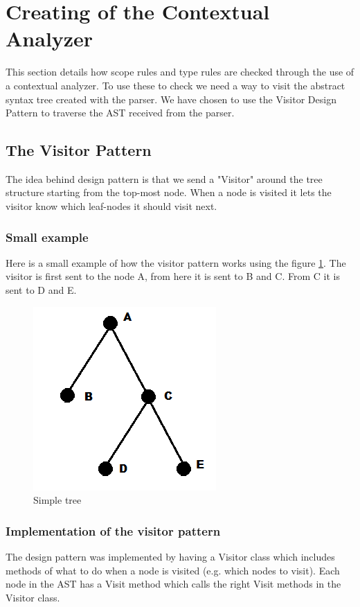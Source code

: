 \section{Creating of the Contextual Analyzer}
	This section details how scope rules and type rules are checked through the use of a contextual analyzer.
	To use these to check we need a way to visit the abstract syntax tree created with the parser. We have chosen to use 
	the Visitor Design Pattern to traverse the AST received from the parser.
	
	\subsection{The Visitor Pattern}
		The idea behind design pattern is that we send a "Visitor" around the tree structure starting from the top-most node. When a node is 
		visited it lets the visitor know which leaf-nodes it should visit next. \\
		
		\subsubsection*{Small example}
			Here is a small example of how the visitor pattern works using the figure \ref{fig:simpletree}. 
			The visitor is first sent to the node A, from here it is sent to B and C. From C it is sent to D and E.
		
			\begin{figure}
				\centering
				\includegraphics{rapport/6/figures/simpletree}
				\caption{Simple tree} \label{fig:simpletree}
			\end{figure}
			
		\subsubsection{Implementation of the visitor pattern}
			The design pattern was implemented by having a Visitor class which includes methods of what to do when a node is visited 
			(e.g. which nodes to visit). Each node in the AST has a Visit method which calls the right Visit methods in the Visitor class. \\
	
